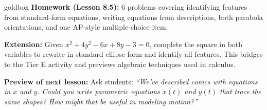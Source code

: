 \documentclass[10pt]{article}
\begin{document}
\vspace{0.08in}

\begin{skillbox}{goldbox}
\textbf{Homework (Lesson 8.5):} 6 problems covering identifying features from
standard-form equations, writing equations from descriptions, both parabola
orientations, and one AP-style multiple-choice item.

\textbf{Extension:} Given $x^2 + 4y^2 - 6x + 8y - 3 = 0$, complete the square
in both variables to rewrite in standard ellipse form and identify all features.
This bridges to the Tier E activity and previews algebraic techniques used in
calculus.

\textbf{Preview of next lesson:} Ask students: \textit{``We've described conics
with equations in $x$ and $y$. Could you write parametric equations $x(t)$ and
$y(t)$ that trace the same shapes? How might that be useful in modeling
motion?''}
\end{skillbox}
\end{document}
